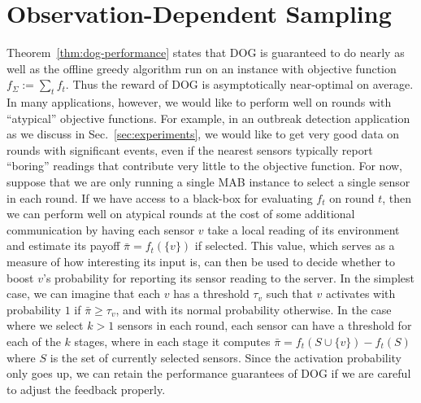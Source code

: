 \documentclass{sig-alternate-dan}
\numberwithin{equation}{section}
\newcommand{\algofont}[1]{\textsc{#1}}
\newcommand{\algoname}{{\algofont{DOG}}\xspace}
\newcommand{\estimate}[1]{\bar{#1}}
\newcommand{\thresh}{\ensuremath{\tau}}
\newcommand{\dog}{\algofont{DOG}\xspace}
\newcommand{\sensor}{\ensuremath{v}}
\newcommand{\obj}{\ensuremath{f}} %
\newcommand{\K}{\ensuremath{k}}
\newcommand{\payoff}{\ensuremath{\pi}}
\newcommand{\secref}[1]{Sec.~\ref{#1}}
\begin{document}
%

%
%
%
%
%
%



%

%


%
\section{Observation-Dependent Sampling} \label{sec:measure-dependent-sampling}
%
%

Theorem~\ref{thm:dog-performance} states that
\algoname is guaranteed to do nearly as well as the offline greedy
algorithm run on an instance with objective function $\obj_{\Sigma} :=
\sum_{t} \obj_t$.  Thus the reward of \algoname is asymptotically near-optimal on average.
In many applications, however, we would like to perform well on rounds
with ``atypical'' objective functions.  For example, in an outbreak detection application as we discuss in \secref{sec:experiments}, we would like to get very good data on rounds with
significant events, even if the nearest sensors typically
report ``boring'' readings that contribute very little to the
objective function.   For now, suppose that we are only running a
single MAB instance to select a single sensor in each round.
If we have access to 
%
a black-box for evaluating $\obj_t$ on round $t$, then 
we can perform well on atypical rounds at the cost of some additional
communication by having each sensor $\sensor$ take a local reading of its
environment and estimate its payoff $\estimate{\payoff}=\obj_{t}(\{v\})$ if
selected.  This value, which serves as a measure of how interesting
its input is, can then be used to decide whether to boost $\sensor$'s probability for
reporting its sensor reading to the server.
In the simplest case, we can imagine that each $\sensor$ has a threshold 
$\thresh_{\sensor}$ such that $\sensor$ activates with probability $1$
if $\estimate{\payoff} \ge \thresh_{\sensor}$, and with its normal
probability otherwise.  
In the case where we select $\K > 1$ sensors
in each round, each sensor can have a threshold for each of the $\K$
stages, where in each stage it computes $\estimate{\payoff}=\obj_{t}(S \cup \{v\}) -
\obj_{t}(S)$ where $S$ is the set of currently selected sensors.
Since the activation probability only goes up, 
we can retain the performance guarantees of \dog if we are
careful to adjust the feedback properly.
\end{document}
